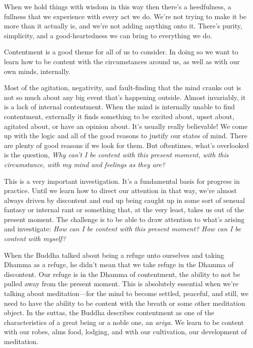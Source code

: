 When we hold things with wisdom in this way then there's a heedfulness, 
a fullness that we experience with every act we do. We're not trying to 
make it be more than it actually is, and we're not adding anything onto 
it. There's purity, simplicity, and a good-heartedness we can bring to 
everything we do.


Contentment is a good theme for all of us to consider. In doing so we 
want to learn how to be content with the circumstances around us, as 
well as with our own minds, internally.

Most of the agitation, negativity, and fault-finding that the mind 
cranks out is not so much about any big event that's happening outside. 
Almost invariably, it is a lack of internal contentment. When the mind 
is internally unable to find contentment, externally it finds something 
to be excited about, upset about, agitated about, or have an opinion 
about. It's usually really believable! We come up with the logic and 
all of the good reasons to justify our states of mind. There are plenty 
of good reasons if we look for them. But oftentimes, what's overlooked 
is the question, \emph{Why can't I be content with this present moment, 
with this circumstance, with my mind and feelings as they are?}

This is a very important investigation. It's a fundamental basis for 
progress in practice. Until we learn how to direct our attention in 
that way, we're almost always driven by discontent and end up being 
caught up in some sort of sensual fantasy or internal rant or something 
that, at the very least, takes us out of the present moment. The 
challenge is to be able to draw attention to what's arising and 
investigate: \emph{How can I be content with this present moment? How 
can I be content with myself?}

When the Buddha talked about being a refuge unto ourselves and taking 
Dhamma as a refuge, he didn't mean that we take refuge in the Dhamma of 
discontent. Our refuge is in the Dhamma of contentment, the ability to 
not be pulled away from the present moment. This is absolutely 
essential when we're talking about meditation---for the mind to become 
settled, peaceful, and still, we need to have the ability to be content 
with the breath or some other meditation object. In the suttas, the 
Buddha describes contentment as one of the characteristics of a great 
being or a noble one, an \emph{ariya}. We learn to be content with our 
robes, alms food, lodging, and with our cultivation, our development of 
meditation.

